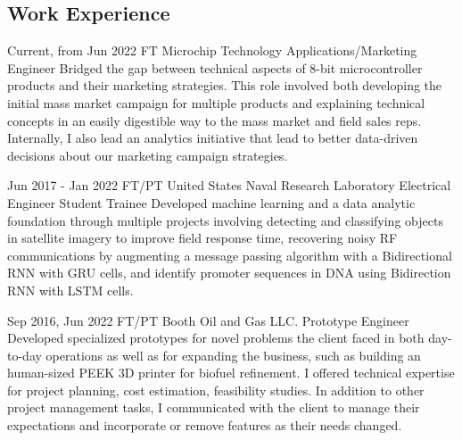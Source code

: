 \documentclass[
	10pt, %
]{FreemanCV}
\begin{document}
\begin{paracol}{2}
\section{Work Experience}





\jobentry
	{Current, from Jun 2022} %
	{FT} %
	{Microchip Technology} %
	{Applications/Marketing Engineer} %
	{ %
		Bridged the gap between technical aspects of 8-bit microcontroller products and their marketing strategies.
		This role involved both developing the initial mass market campaign for multiple products
		and explaining technical concepts in an easily digestible way to the mass market and field sales reps. 
		Internally, I also lead an analytics initiative that lead to better data-driven decisions about our marketing campaign strategies.
	} 


\jobentry
	{Jun 2017 - Jan 2022} %
	{FT/PT} %
	{United States Naval Research Laboratory} %
	{Electrical Engineer Student Trainee} %
	{ %
		Developed machine learning and a data analytic foundation through multiple projects involving
		detecting and classifying objects in satellite imagery to improve field response time,
		recovering noisy RF communications by augmenting a message passing algorithm with a Bidirectional RNN with GRU cells, 
		and identify promoter sequences in DNA using Bidirection RNN with LSTM cells.
	} 


\jobentry
	{Sep 2016, Jun 2022} %
	{FT/PT} %
	{Booth Oil and Gas LLC.} %
	{Prototype Engineer} %
	{ %
		Developed specialized prototypes for novel problems the client faced in both day-to-day operations
		as well as for expanding the business, such as building an human-sized PEEK 3D printer for biofuel refinement.
		I offered technical expertise for project planning, cost estimation, feasibility studies.
		In addition to other project management tasks, I communicated with the client to manage their expectations
		and incorporate or remove features as their needs changed.
	}




\end{paracol}
\end{document}
